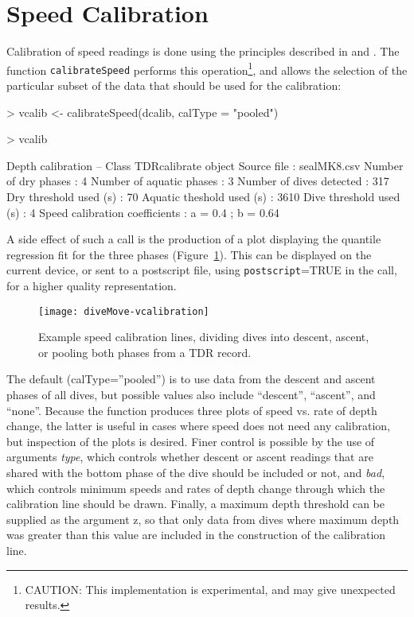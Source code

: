 \documentclass[12pt, letterpaper]{scrartcl}
\newcommand{\Rfunction}[1]{{\texttt{#1}}}
\newcommand{\Rfunarg}[1]{{\textit{#1}}}
\begin{document}
\section{Speed Calibration}
\label{sec:speed}

Calibration of speed readings is done using the principles described in
\citet{1929} and \citet{1291}.  The function \Rfunction{calibrateSpeed}
performs this operation\footnote{CAUTION: This implementation is
  experimental, and may give unexpected results.}, and allows the
selection of the particular subset of the data that should be used for the
calibration:

\begin{Schunk}
\begin{Sinput}
> vcalib <- calibrateSpeed(dcalib, calType = "pooled")
\end{Sinput}
\end{Schunk}
\begin{Schunk}
\begin{Sinput}
> vcalib
\end{Sinput}
\begin{Soutput}
Depth calibration -- Class TDRcalibrate object
  Source file                       : sealMK8.csv 
  Number of dry phases              : 4 
  Number of aquatic phases          : 3 
  Number of dives detected          : 317 
  Dry threshold used (s)            : 70 
  Aquatic theshold used (s)         : 3610 
  Dive threshold used (s)           : 4 
  Speed calibration coefficients    : a = 0.4 ; b = 0.64 
\end{Soutput}
\end{Schunk}
A side effect of such a call is the production of a plot displaying the
quantile regression fit for the three phases (Figure~\ref{fig:rqplots}).
This can be displayed on the current device, or sent to a postscript file,
using \Rfunction{postscript}=TRUE in the call, for a higher quality
representation.

\begin{figure}[hbtp]
  \centering
  \texttt{[image: diveMove-vcalibration]}
  \caption{Example speed calibration lines, dividing dives into
    descent, ascent, or pooling both phases from a TDR record.}
  \label{fig:rqplots}
\end{figure}

The default (calType=''pooled'') is to use data from the descent and
ascent phases of all dives, but possible values also include ``descent'',
``ascent'', and ``none''.  Because the function produces three plots of
speed vs. rate of depth change, the latter is useful in cases where speed
does not need any calibration, but inspection of the plots is desired.
Finer control is possible by the use of arguments \Rfunarg{type}, which
controls whether descent or ascent readings that are shared with the
bottom phase of the dive should be included or not, and \Rfunarg{bad},
which controls minimum speeds and rates of depth change through which the
calibration line should be drawn.  Finally, a maximum depth threshold can
be supplied as the argument z, so that only data from dives where maximum
depth was greater than this value are included in the construction of the
calibration line.
\end{document}
